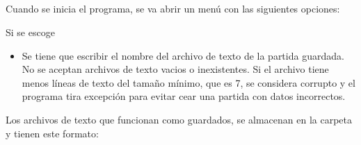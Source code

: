 \documentclass[letterpaper,10pt,english]{sphinxmanual}
\begin{document}
\begin{sphinxVerbatim}[commandchars=\\\{\}]
 
\end{sphinxVerbatim}


\subsection{}
\label{\detokenize{tutorial:instrucciones-para-empezar-a-jugar}}
Cuando se inicia el programa, se va abrir un menú con las siguientes opciones:

\begin{sphinxVerbatim}[commandchars=\\\{\}]
 
 
\end{sphinxVerbatim}

Si se escoge 
\begin{itemize}
\item {} 
Se tiene que escribir el nombre del archivo de texto de la partida guardada. No se aceptan archivos de texto vacios o inexistentes. Si el archivo tiene menos líneas de texto del tamaño mínimo, que es 7, se considera corrupto y el programa tira excepción para evitar cear una partida con datos incorrectos.

\end{itemize}

Los archivos de texto que funcionan como guardados, se almacenan en la carpeta  y tienen este formato:
\end{document}
